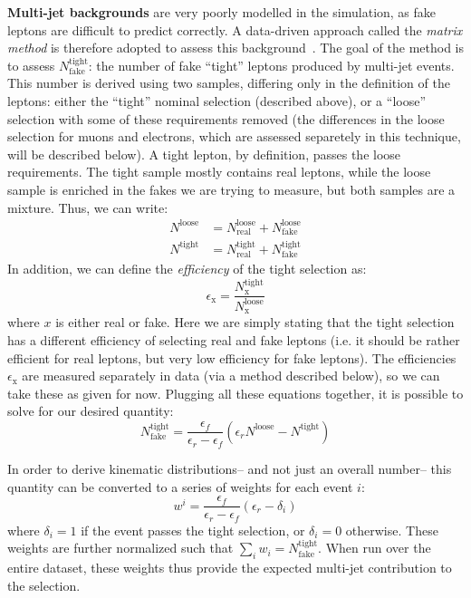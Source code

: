 \textbf{Multi-jet backgrounds} are very poorly modelled in the simulation, as fake leptons are difficult to predict correctly. A data-driven approach called the \textit{matrix method} is therefore adopted to assess this background~\cite{MatrixMethod}. The goal of the method is to assess $N_\mathrm{fake}^\mathrm{tight}$: the number of fake ``tight'' leptons produced by multi-jet events.  This number is derived using two samples, differing only in the definition of the leptons: either the ``tight'' nominal selection (described above), or a ``loose'' selection with some of these requirements removed (the differences in the loose selection for muons and electrons, which are assessed separetely in this technique, will be described below). A tight lepton, by definition, passes the loose requirements. The tight sample mostly contains real leptons, while the loose sample is enriched in the fakes we are trying to measure, but both samples are a mixture. Thus, we can write:
%
\begin{align}
N^\mathrm{loose} &= N_\mathrm{real}^\mathrm{loose} + N_\mathrm{fake}^\mathrm{loose}\\
N^\mathrm{tight} &= N_\mathrm{real}^\mathrm{tight} + N_\mathrm{fake}^\mathrm{tight}
\end{align}
%
In addition, we can define the \textit{efficiency} of the tight selection as:
%
\begin{equation}
\epsilon_\mathrm{x} = \frac{N^\mathrm{tight}_\mathrm{x}}{N^\mathrm{loose}_\mathrm{x}}
\end{equation}
%
where $x$ is either real or fake. Here we are simply stating that the tight selection has a different efficiency of selecting real and fake leptons (i.e. it should be rather efficient for real leptons, but very low efficiency for fake leptons). The efficiencies $\epsilon_\mathrm{x}$ are measured separately in data (via a method described below), so we can take these as given for now. Plugging all these equations together, it is possible to solve for our desired quantity:
%
\begin{equation}
N_\mathrm{fake}^\mathrm{tight} = \frac{\epsilon_f}{\epsilon_r - \epsilon_f} \left(\epsilon_r N^\mathrm{loose} - N^\mathrm{tight} \right)
\end{equation}

In order to derive kinematic distributions-- and not just an overall number-- this quantity can be converted to a series of weights for each event $i$:
%
\begin{equation}
w^i = \frac{\epsilon_f}{\epsilon_r - \epsilon_f} (\epsilon_r - \delta_i)
\end{equation}
%
where $\delta_i = 1$ if the event passes the tight selection, or $\delta_i = 0$ otherwise. These weights are further normalized such that $\sum_i w_i = N_\mathrm{fake}^\mathrm{tight}$. When run over the entire dataset, these weights thus provide the expected multi-jet contribution to the selection.

